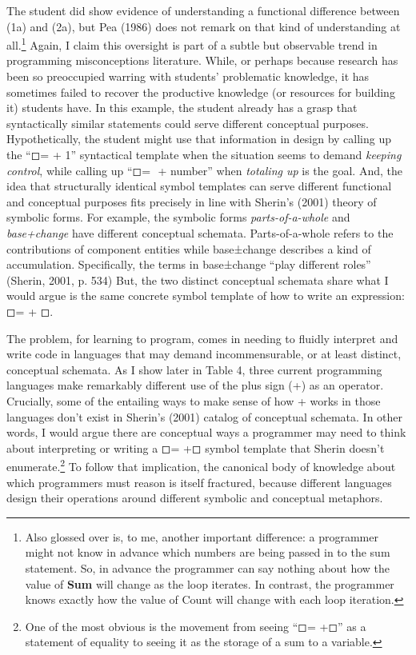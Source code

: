 The student did show evidence of understanding a functional difference
between (1a) and (2a), but Pea (1986) does not remark on that kind of
understanding at all.\footnote{Also glossed over is, to me, another
  important difference: a programmer might not know in advance which
  numbers are being passed in to the sum statement. So, in advance the
  programmer can say nothing about how the value of \textbf{Sum} will
  change as the loop iterates. In contrast, the programmer knows exactly
  how the value of Count will change with each loop iteration.} Again, I
claim this oversight is part of a subtle but observable trend in
programming misconceptions literature. While, or perhaps because
research has been so preoccupied warring with students' problematic
knowledge, it has sometimes failed to recover the productive knowledge
(or resources for building it) students have. In this example, the
student already has a grasp that syntactically similar statements could
serve different conceptual purposes. Hypothetically, the student might
use that information in design by calling up the ``◻=︎ + 1'' syntactical
template when the situation seems to demand \emph{keeping control},
while calling up ``◻= ︎ + number'' when \emph{totaling up} is the goal.
And, the idea that structurally identical symbol templates can serve
different functional and conceptual purposes fits precisely in line with
Sherin's (2001) theory of symbolic forms. For example, the symbolic
forms \emph{parts-of-a-whole} and \emph{base+change} have different
conceptual schemata. Parts-of-a-whole refers to the contributions of
component entities while base±change describes a kind of accumulation.
Specifically, the terms in base±change ``play different roles'' (Sherin,
2001, p. 534) But, the two distinct conceptual schemata share what I
would argue is the same concrete symbol template of how to write an
expression: ◻=︎ + ◻.

The problem, for learning to program, comes in needing to fluidly
interpret and write code in languages that may demand incommensurable,
or at least distinct, conceptual schemata. As I show later in Table 4,
three current programming languages make remarkably different use of the
plus sign (+) as an operator. Crucially, some of the entailing ways to
make sense of how + works in those languages don't exist in Sherin's
(2001) catalog of conceptual schemata. In other words, I would argue
there are conceptual ways a programmer may need to think about
interpreting or writing a ◻=︎ +◻ symbol template that Sherin doesn't
enumerate.\footnote{One of the most obvious is the movement from seeing
  ``◻=︎ +◻'' as a statement of equality to seeing it as the storage of a
  sum to a variable.} To follow that implication, the canonical body of
knowledge about which programmers must reason is itself fractured,
because different languages design their operations around different
symbolic and conceptual metaphors.

